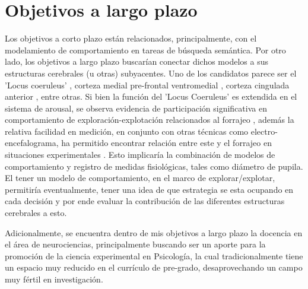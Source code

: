 \documentclass[11pt]{article}
\begin{document}
\section{Objetivos a largo plazo}
\label{sec:orgbe60ffa}
Los objetivos a corto plazo están relacionados, principalmente, con el
modelamiento de comportamiento en tareas de búsqueda semántica. Por otro lado,
los objetivos a largo plazo buscarían conectar dichos modelos a sus estructuras
cerebrales (u otras) subyacentes. Uno de los candidatos parece ser el 'Locus
coeruleus' \citep{kaneIncreasedLocusCoeruleus2017}, corteza medial pre-frontal
ventromedial \citep{kollingNeuralMechanismsForaging2012}, corteza cingulada
anterior \citep{shenhavAnteriorCingulateEngagement2014}, entre otras. Si bien la
función del 'Locus Coeruleus' es extendida en el sistema de arousal, se observa
evidencia de participación significativa en comportamiento de
exploración-explotación relacionados al forrajeo
\citep{aston-jonesAdaptiveGainRole2005}, además la relativa facilidad en medición,
en conjunto con otras técnicas como electro-encefalograma, ha permitido
encontrar relación entre este y el forrajeo en situaciones experimentales
\citep{slanziCombiningEyeTracking2017}. Esto implicaría la combinación de modelos
de comportamiento y registro de medidas fisiológicas, tales como diámetro de
pupila. El tener un modelo de comportamiento, en el marco de explorar/explotar,
permitiría eventualmente, tener una idea de que estrategia se esta ocupando en
cada decisión y por ende evaluar la contribución de las diferentes estructuras
cerebrales a esto.

Adicionalmente, se encuentra dentro de mis objetivos a largo plazo la docencia
en el área de neurociencias, principalmente buscando ser un aporte para la
promoción de la ciencia experimental en Psicología, la cual tradicionalmente
tiene un espacio muy reducido en el currículo de pre-grado, desaprovechando un
campo muy fértil en investigación.
\begin{Latex}
\pagebreak
\end{Latex}


\end{document}
